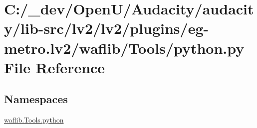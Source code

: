 \hypertarget{lv2_2plugins_2eg-metro_8lv2_2waflib_2_tools_2python_8py}{}\section{C\+:/\+\_\+dev/\+Open\+U/\+Audacity/audacity/lib-\/src/lv2/lv2/plugins/eg-\/metro.lv2/waflib/\+Tools/python.py File Reference}
\label{lv2_2plugins_2eg-metro_8lv2_2waflib_2_tools_2python_8py}
\subsection*{Namespaces}
\begin{DoxyCompactItemize}
\item 
 \hyperlink{namespacewaflib_1_1_tools_1_1python}{waflib.\+Tools.\+python}
\end{DoxyCompactItemize}
